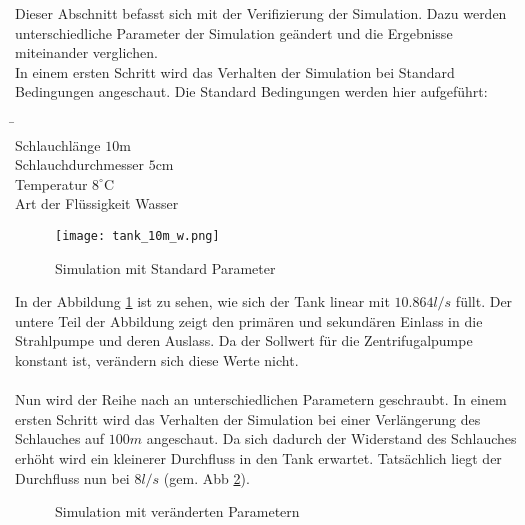 Dieser Abschnitt befasst sich mit der Verifizierung der Simulation. Dazu werden unterschiedliche Parameter der Simulation geändert und die Ergebnisse miteinander verglichen.\\
In einem ersten Schritt wird das Verhalten der Simulation bei Standard Bedingungen angeschaut. Die Standard Bedingungen werden hier aufgeführt:

\begin{tabbing}
\hspace{120mm}			\=  \hspace{10mm} \=	\\
Schlauchlänge			\> $10$m		\\
Schlauchdurchmesser		\> $5$cm		\\
Temperatur			\> $8^{\circ}$C		\\
Art der Flüssigkeit		\> Wasser	\> 		\\
\end{tabbing}

\begin{figure}[htb]
\texttt{[image: tank\_10m\_w.png]}
\caption{Simulation mit Standard Parameter}
\label{fig:Simulation mit Standard Parameter}
\end{figure}

In der Abbildung \ref{fig:Simulation mit Standard Parameter} ist zu sehen, wie sich der Tank linear mit $10.864 l/s$ füllt. Der untere Teil der Abbildung zeigt den primären und sekundären Einlass in die Strahlpumpe und deren Auslass. Da der Sollwert für die Zentrifugalpumpe konstant ist, verändern sich diese Werte nicht.\\
\\
Nun wird der Reihe nach an unterschiedlichen Parametern geschraubt. In einem ersten Schritt wird das Verhalten der Simulation bei einer Verlängerung des Schlauches auf $100 m$ angeschaut. Da sich dadurch der Widerstand des Schlauches erhöht wird ein kleinerer Durchfluss in den Tank erwartet. Tatsächlich liegt der Durchfluss nun bei $8 l/s$ (gem. Abb \ref{fig:Simulation mit veränderten Parametern}).
\clearpage

\begin{figure}[htb]
\caption{Simulation mit veränderten Parametern}
\label{fig:Simulation mit veränderten Parametern}
\end{figure}


